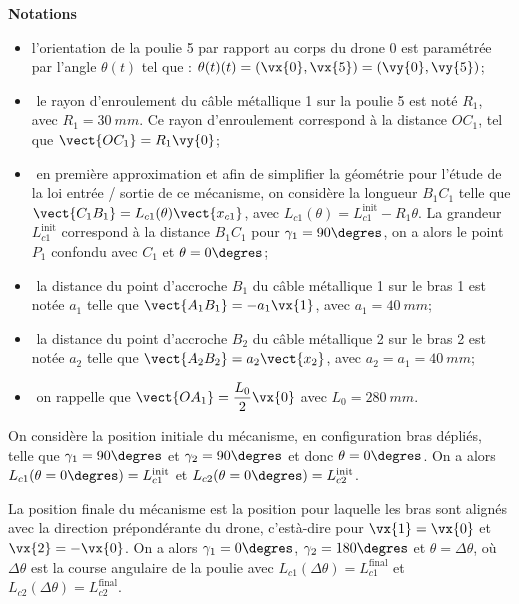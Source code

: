\textbf{Notations}
\begin{itemize}
\item l’orientation de la poulie 5 par rapport au corps du drone 0 est paramétrée par l’angle
$\theta(t)$ tel que : $\theta(t)(t) = \left(\vx{0},\vx{5}\right) = \left(\vy{0},\vy{5}\right)$;
\item­ le rayon d’enroulement du câble métallique 1 sur la poulie 5 est noté $R_1$, avec
$R_1 = \SI{30}{mm}$. Ce rayon d’enroulement correspond à la distance $OC_1$, tel que $\vect{OC_1}= R_1\vy{0}$;
\item­ en première approximation et afin de simplifier la géométrie pour l’étude de la loi entrée
/ sortie de ce mécanisme, on considère la longueur $B_1C_1$ telle que $\vect{C_1B_1} = L_{c1}(\theta) \vect{x_{c1}}$, avec $L_{c1}(\theta) = L^{\text{init}}_{c1} - R_1\theta$. La grandeur $L^{\text{init}}_{c1}$ correspond à la distance $B_1C_1$ pour $\gamma_1 = 90\degres$, on a
alors le point $P_1$ confondu avec $C_1$ et $\theta = 0\degres$;
\item­ la distance du point d’accroche $B_1$ du câble métallique 1 sur le bras 1 est notée $a_1$ telle
que $\vect{A_1B_1} = -a_1 \vx{1}$, avec $a_1 = \SI{40}{mm}$;
\item­ la distance du point d’accroche $B_2$ du câble métallique 2 sur le bras 2 est notée $a_2$ telle
que $\vect{A_2B_2} = a_2 \vect{x_2}$, avec $a_2 = a_1 = \SI{40}{mm}$;
\item­ on rappelle que $\vect{OA_1} = \dfrac{L_0}{2}\vx{0}$  avec $L_0 = \SI{280}{mm}$.
\end{itemize}

On considère la position initiale du mécanisme, en configuration bras dépliés, telle que
$\gamma_1= 90\degres$ et $\gamma_2 = 90\degres$ et donc $\theta = 0\degres$. On a alors $L_{c1}(\theta = 0\degres) = L^{\text{init}}_{c1}$ et $L_{c2}(\theta = 0\degres) = L^{\text{init}}_{c2}$.

La position finale du mécanisme est la position pour laquelle les bras sont alignés avec la
direction prépondérante du drone, c’est­à-dire pour $\vx{1} = \vx{0}$ et $\vx{2} = -\vx{0}$. On a alors $\gamma_1 = 0\degres$, $\gamma_2 = 180\degres$ et $\theta = \Delta \theta$, où $\Delta \theta$ est la course angulaire de la poulie avec $L_{c1}(\Delta \theta) = L^{\text{final}}_{c1}$ et
$L_{c2}(\Delta \theta) = L^{\text{final}}_{c2}$.